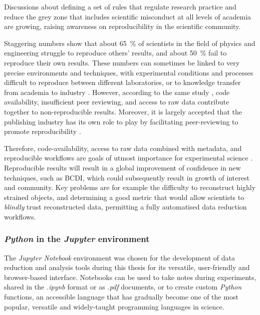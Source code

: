 Discussions about defining a set of rules that regulate research practice \parencite{Kretser2019} and reduce the grey zone that includes scientific misconduct at all levels of academia \parencite{Kornfeld2016} are growing, raising awareness on reproducibility in the scientific community.

Staggering numbers \parencite{Baker2016} show that about \qty{65}{\percent} of scientists in the field of physics and engineering struggle to reproduce others' results, and about \qty{50}{\percent} fail to reproduce their own results.
These numbers can sometimes be linked to very precise environments and techniques, with experimental conditions and processes difficult to reproduce between different laboratories, or to knowledge transfer from academia to industry \parencite{Sarwitz2015}.
However, according to the same study \parencite{Baker2016}, code availability, insufficient peer reviewing, and access to raw data contribute together to non-reproducible results.
Moreover, it is largely accepted that the publishing industry has its own role to play by facilitating peer-reviewing to promote reproducibility \parencite{Lee2017}.

Therefore, code-availability, access to raw data combined with metadata, and reproducible workflows are goals of utmost importance for experimental science \parencite{Munafo2017}.
Reproducible results will result in a global improvement of confidence in new techniques, such as BCDI, which could subsequently result in growth of interest and community.
Key problems are for example the difficulty to reconstruct highly strained objects, and determining a good metric that would allow scientists to \textit{blindly} trust reconstructed data, permitting a fully automatised data reduction workflows.

\subsubsection{\textit{Python} in the \textit{Jupyter} environment}

The \textit{Jupyter Notebook} environment \parencite{Perez2007, Kluyver2016} was chosen for the development of data reduction and analysis tools during this thesis for its versatile, user-friendly and browser-based interface.
Notebooks can be used to take notes during experiments, shared in the \textit{.ipynb} format or as \textit{.pdf} documents, or to create custom \textit{Python} functions, an accessible language that has gradually become one of the most popular, versatile \parencite{Perez2007, Behnel2011, Newville2016, Ronaghi2017} and widely-taught \parencite{Ayer2014, Scopatz2015, McKinney2017, Boulle2019} programming languages in science.

